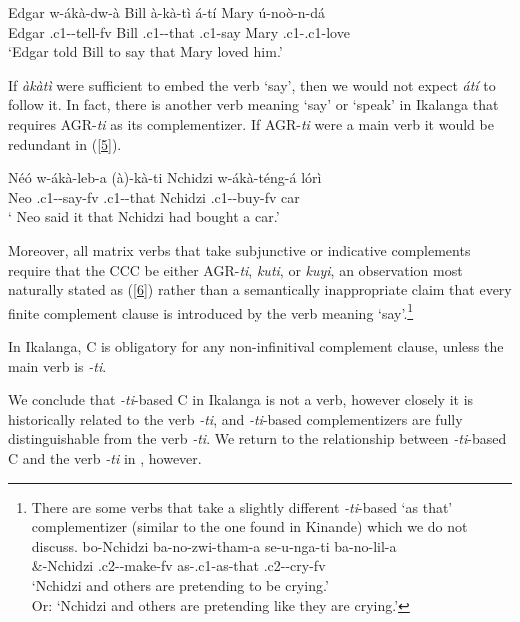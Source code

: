 \documentclass[output=paper,
modfonts
]{langscibook}
\begin{document}
\ea \gll Edgar w-ákà-dw-à  Bill à-kà-tì  á-tí  Mary 	ú-noò-n-dá\\
        Edgar .c1--tell-fv Bill .c1--that .c1-say Mary  .c1-.c1-love\\
       \glt `Edgar told Bill to say that Mary loved him.'
       \z 
       
If \textit{àkàtì} were sufficient to embed the verb `say', then we would not expect \textit{átí} to follow it. In fact, there is another verb meaning `say' or `speak' in Ikalanga that requires AGR-\textit{ti} as its complementizer. If AGR-\textit{ti} were a main verb it would be redundant in (\ref{5}).

\ea\label{5} \gll Néó w-ákà-leb-a    (à)-kà-ti  Nchidzi w-ákà-téng-á  lórì\\
         Neo .c1--say-fv  .c1--that Nchidzi .c1--buy-fv car\\
     \glt ` Neo said it that Nchidzi had bought a car.'
            \z
            
Moreover, all matrix verbs that take subjunctive or indicative complements require that the CCC be either AGR-\textit{ti}, \textit{kuti}, or \textit{kuyi}, an observation most naturally stated as (\ref{6}) rather than a semantically inappropriate claim that every finite complement clause is introduced by the verb meaning `say'.\footnote{There are some verbs that take a slightly different \textit{-ti}-based `as that' complementizer (similar to the one found in Kinande) which we do not discuss.
\ea \gll bo-Nchidzi  ba-no-zwi-tham-a  se-u-nga-ti	  ba-no-lil-a\\
      \&-Nchidzi   .c2--make-fv  as-.c1-as-that  .c2--cry-fv\\
     \glt `Nchidzi and others are pretending to be crying.' \\
     Or: `Nchidzi and others are pretending like they are crying.'\z}  

\ea \label{6}
\textup{In Ikalanga, C is obligatory for any non-infinitival complement clause, unless the 	main verb is} \textit{-ti}.
\z

We conclude that \textit{-ti}-based C in Ikalanga is not a verb, however closely it is historically related to the verb \textit{-ti}, and \textit{-ti}-based complementizers are fully distinguishable from the verb \textit{-ti}. We return to the relationship between \textit{-ti}-based C and the verb \textit{-ti} in , however. 
\end{document}
